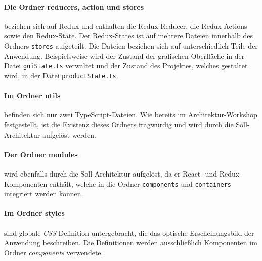 \paragraph{Die Ordner reducers, action und stores} beziehen sich auf Redux und enthalten die Redux-Reducer, die Redux-Actions sowie den Redux-State. Der Redux-States ist auf mehrere Dateien innerhalb des Ordners \lstinline|stores| aufgeteilt. Die Dateien beziehen sich auf unterschiedlich Teile der Anwendung. Beispielsweise wird der Zustand der grafischen Oberfläche in der Datei \lstinline|guiState.ts| verwaltet und der Zustand des Projektes, welches gestaltet wird, in der Datei \lstinline|productState.ts|. 



\paragraph{Im Ordner utils} befinden sich nur zwei TypeScript-Dateien. Wie bereits im Architektur-Workshop festgestellt, ist die Existenz dieses Ordners fragwürdig und wird durch die 
Soll-Architektur aufgelöst werden.  

\paragraph{Der Ordner modules} wird ebenfalls durch die Soll-Architektur aufgelöst, da er React- und Redux-Komponenten enthält, welche in die Ordner \lstinline|components| und \lstinline|containers| integriert werden können.

\paragraph{Im Ordner styles} sind globale \emph{CSS}-Definition untergebracht, die das optische Erscheinungsbild der Anwendung beschreiben. Die Definitionen werden ausschließlich Komponenten im Ordner \emph{components} verwendete. 


